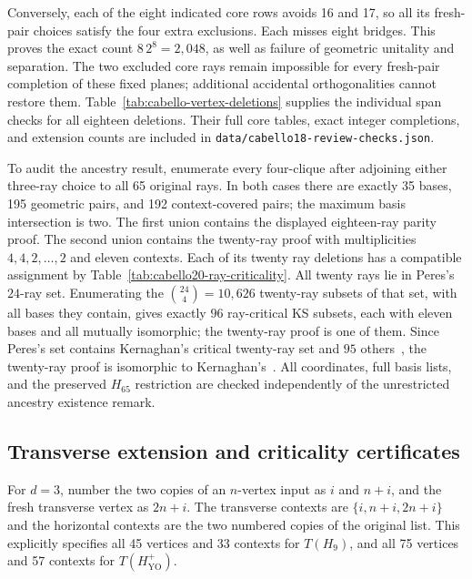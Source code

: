 \documentclass[aps,pra,reprint,superscriptaddress,longbibliography,nofootinbib,floatfix,10pt]{revtex4-2}
\theoremstyle{definition}
\newcommand{\YO}{\mathrm{YO}}
\begin{document}
Conversely, each of the eight indicated core rows avoids 16 and 17,
so all its fresh-pair choices satisfy the four extra exclusions.
Each misses eight bridges. This proves the exact count $8\,2^8=2{,}048$,
as well as failure of geometric unitality and separation. The two
excluded core rays remain impossible for every fresh-pair completion
of these fixed planes; additional accidental orthogonalities cannot
restore them. Table~\ref{tab:cabello-vertex-deletions} supplies the
individual span checks for all eighteen deletions. Their full core
tables, exact integer completions, and extension counts are included
in \texttt{data/cabello18-review-checks.json}.

To audit the ancestry result, enumerate every four-clique after
adjoining either three-ray choice to all 65 original rays. In both
cases there are exactly 35 bases, 195 geometric pairs, and 192
context-covered pairs; the maximum basis intersection is two.
The first union contains the displayed eighteen-ray parity proof.
The second union contains the twenty-ray proof with multiplicities
$4,4,2,\ldots,2$ and eleven contexts. Each of its twenty ray deletions
has a compatible assignment by Table~\ref{tab:cabello20-ray-criticality}.
All twenty rays lie in Peres's $24$-ray set. Enumerating the
$\binom{24}{4}=10{,}626$ twenty-ray subsets of that set, with all bases
they contain, gives exactly $96$ ray-critical KS subsets, each with
eleven bases and all mutually isomorphic; the twenty-ray proof is one of
them. Since Peres's set contains Kernaghan's critical twenty-ray set and
$95$ others~\cite{cabello-96}, the twenty-ray proof is isomorphic to
Kernaghan's~\cite{Kernaghan-1994}.
All coordinates, full basis lists, and the preserved $H_{65}$
restriction are checked independently of the unrestricted ancestry
existence remark.

\subsection{Transverse extension and criticality certificates}
\label{app:transverse-certificates}
For $d=3$, number the two copies of an $n$-vertex input as
$i$ and $n+i$, and the fresh transverse vertex as $2n+i$.
The transverse contexts are $\{i,n+i,2n+i\}$ and the horizontal
contexts are the two numbered copies of the original list. This
explicitly specifies all 45 vertices and 33 contexts for $T(H_9)$,
and all 75 vertices and 57 contexts for $T(H_{\YO}^+)$.
\end{document}
